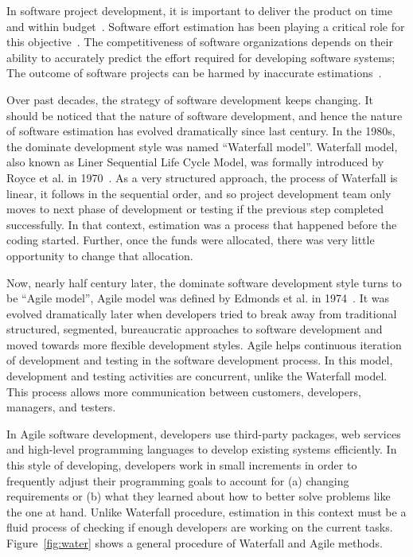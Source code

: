 \documentclass[sigconf,review]{acmart}
\newcommand{\fig}[1]{Figure~\ref{fig:#1}}
\begin{document}
In software project development, it is important to deliver the product on time and within  budget~\cite{briand2002resource,kocaguneli2011experiences,trendowicz2014software}. Software effort estimation has been playing a critical role for this objective~\cite{sarro2016multi}. The competitiveness of software
organizations depends on their ability to accurately predict the  effort  required  for  developing  software  systems; The outcome of software projects can be harmed by inaccurate estimations~\cite{trendowicz2014software,mcconnell2006software,mendes2002further,sommerville2010software}.

Over past decades, the strategy of software development keeps changing. It should be noticed that the nature of software development, and hence the nature of software estimation has evolved dramatically since last century. In the 1980s, the dominate development style was named ``Waterfall model''. Waterfall model, also known as Liner Sequential Life Cycle Model, was formally introduced by Royce et al. in 1970~\cite{royce1970software}. As a very structured approach, the process of Waterfall is linear, it follows in the sequential order, and so project development team only moves to next phase of development or testing if the previous step completed successfully. In that context, estimation was a process that happened before the coding started. Further, once the funds were allocated, there was very little opportunity to change that allocation.


Now, nearly half century later, the dominate software development style turns to be ``Agile model'', Agile model was defined by Edmonds et al. in 1974~\cite{edmonds1974process}. It was evolved dramatically later when developers tried to break away from traditional structured, segmented, bureaucratic approaches to software development and moved towards more flexible development styles. Agile helps continuous iteration of development and testing in the software development process. In this model, development and testing activities are concurrent, unlike the Waterfall model. This process allows more communication between customers, developers, managers, and testers.

In Agile software development, developers use third-party packages, web services and high-level programming languages to develop existing systems efficiently. In this style of developing, developers work in small increments in order to frequently adjust their programming goals to account for (a) changing requirements or (b) what they learned about how to better solve problems like the one at hand. Unlike Waterfall procedure, estimation in this context must be a fluid process of checking if enough developers are working on the current tasks. \fig{water} shows a general procedure of Waterfall and Agile methods.
\end{document}
